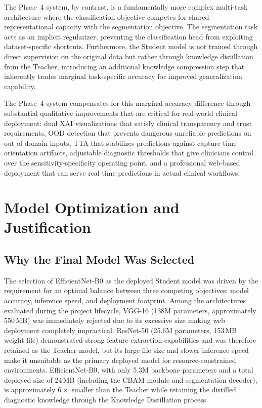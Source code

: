 \documentclass[conference]{IEEEtran}
\begin{document}
The Phase~4 system, by contrast, is a fundamentally more complex multi-task architecture where the classification objective competes for shared representational capacity with the segmentation objective. The segmentation task acts as an implicit regularizer, preventing the classification head from exploiting dataset-specific shortcuts. Furthermore, the Student model is not trained through direct supervision on the original data but rather through knowledge distillation from the Teacher, introducing an additional knowledge compression step that inherently trades marginal task-specific accuracy for improved generalization capability.

The Phase~4 system compensates for this marginal accuracy difference through substantial qualitative improvements that are critical for real-world clinical deployment: dual XAI visualizations that satisfy clinical transparency and trust requirements, OOD detection that prevents dangerous unreliable predictions on out-of-domain inputs, TTA that stabilizes predictions against capture-time orientation artifacts, adjustable diagnostic thresholds that give clinicians control over the sensitivity-specificity operating point, and a professional web-based deployment that can serve real-time predictions in actual clinical workflows.

\section{Model Optimization and Justification}

\subsection{Why the Final Model Was Selected}
The selection of EfficientNet-B0 as the deployed Student model was driven by the requirement for an optimal balance between three competing objectives: model accuracy, inference speed, and deployment footprint. Among the architectures evaluated during the project lifecycle, VGG-16 (138M parameters, approximately 550\,MB) was immediately rejected due to its excessive size making web deployment completely impractical. ResNet-50 (25.6M parameters, 153\,MB weight file) demonstrated strong feature extraction capabilities and was therefore retained as the Teacher model, but its large file size and slower inference speed make it unsuitable as the primary deployed model for resource-constrained environments. EfficientNet-B0, with only 5.3M backbone parameters and a total deployed size of 24\,MB (including the CBAM module and segmentation decoder), is approximately $6{\times}$ smaller than the Teacher while retaining the distilled diagnostic knowledge through the Knowledge Distillation process.
\end{document}
